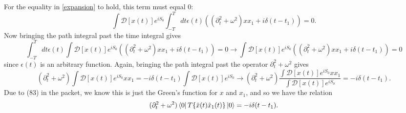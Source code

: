 For the equality in \eqref{expansion} to hold, this term must equal 0:
\begin{equation}
    \int \mathcal D[x(t)]e^{iS_0}\int_{-T}^T dt \epsilon(t)( (\partial_t^2+\omega^2)xx_1+i\delta(t-t_1))=0.
\end{equation}
Now bringing the path integral past the time integral gives 
\begin{equation}
    \int_{-T}^T dt \epsilon(t)\int \mathcal D[x(t)]e^{iS_0}( (\partial_t^2+\omega^2)xx_1+i\delta(t-t_1))=0 \to \int \mathcal D[x(t)]e^{iS_0}( (\partial_t^2+\omega^2)xx_1+i\delta(t-t_1))=0
\end{equation}
since $\epsilon(t)$ is an arbitrary function. Again, bringing the path integral past the operator $\partial_t^2+\omega^2$ gives
\begin{equation}
    (\partial_t^2+\omega^2)\int \mathcal D[x(t)]e^{iS_0} xx_1=-i\delta(t-t_1)\int \mathcal D[x(t)]e^{iS_0} \to  (\partial_t^2+\omega^2) \frac{\int \mathcal D[x(t)]e^{iS_0} xx_1}{\int \mathcal D[x(t)]e^{iS_0}}=-i\delta(t-t_1).
\end{equation}
Due to (83) in the packet, we know this is just the Green's function for $x$ and $x_1$, and so we have the relation
\begin{equation}
    \label{Green}
    (\partial_t^2 + \omega^2)\bra{0}T\{\hat x(t)\hat x_1(t)\} \ket{0}=-i\delta(t-t_1).
\end{equation}

